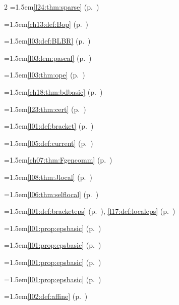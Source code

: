 \begin{multicols}{2}
\hangindent=1.5em\quad \ref{l24:thm:sparse} (p.~\pageref{l24:thm:sparse})\par
\hangindent=1.5em\quad \ref{ch13:def:Bop} (p.~\pageref{ch13:def:Bop})\par
\hangindent=1.5em\quad \ref{l03:def:BLBR} (p.~\pageref{l03:def:BLBR})\par
\hangindent=1.5em\quad \ref{l03:lem:pascal} (p.~\pageref{l03:lem:pascal})\par
\hangindent=1.5em\quad \ref{l03:thm:ope} (p.~\pageref{l03:thm:ope})\par
\hangindent=1.5em\quad \ref{ch18:thm:bdbasic} (p.~\pageref{ch18:thm:bdbasic})\par
\hangindent=1.5em\quad \ref{l23:thm:cert} (p.~\pageref{l23:thm:cert})\par
\hangindent=1.5em\quad \ref{l01:def:bracket} (p.~\pageref{l01:def:bracket})\par
\hangindent=1.5em\quad \ref{l05:def:current} (p.~\pageref{l05:def:current})\par
\hangindent=1.5em\quad \ref{ch07:thm:Fgencomm} (p.~\pageref{ch07:thm:Fgencomm})\par
\hangindent=1.5em\quad \ref{l08:thm:Jlocal} (p.~\pageref{l08:thm:Jlocal})\par
\hangindent=1.5em\quad \ref{l06:thm:selflocal} (p.~\pageref{l06:thm:selflocal})\par
\hangindent=1.5em\quad \ref{l01:def:bracketeps} (p.~\pageref{l01:def:bracketeps}), \ref{l17:def:localeps} (p.~\pageref{l17:def:localeps})\par
\hangindent=1.5em\quad \ref{l01:prop:epsbasic} (p.~\pageref{l01:prop:epsbasic})\par
\hangindent=1.5em\quad \ref{l01:prop:epsbasic} (p.~\pageref{l01:prop:epsbasic})\par
\hangindent=1.5em\quad \ref{l01:prop:epsbasic} (p.~\pageref{l01:prop:epsbasic})\par
\hangindent=1.5em\quad \ref{l01:prop:epsbasic} (p.~\pageref{l01:prop:epsbasic})\par
\hangindent=1.5em\quad \ref{l02:def:affine} (p.~\pageref{l02:def:affine})\par

\end{multicols}
